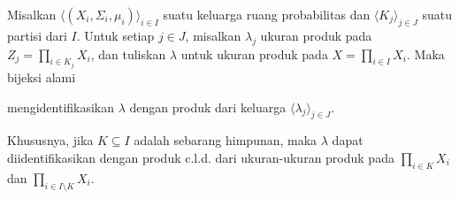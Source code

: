  Misalkan
$\langle(X_i,\Sigma_i,\mu_i)\rangle_{i\in I}$ suatu
keluarga ruang probabilitas dan $\langle K_j\rangle_{j\in J}$ suatu
partisi dari $I$.   Untuk setiap $j\in J$, misalkan $\lambda_j$ ukuran produk
pada $Z_j=\prod_{i\in K_j}X_i$, dan tuliskan $\lambda$ untuk
ukuran produk pada $X=\prod_{i\in I}X_i$.   Maka bijeksi alami


\noindent mengidentifikasikan $\lambda$ dengan produk dari keluarga
$\langle\lambda_j\rangle_{j\in J}$.

Khususnya, jika $K\subseteq I$ adalah sebarang himpunan, maka $\lambda$ dapat
diidentifikasikan dengan produk c.l.d. dari ukuran-ukuran produk pada
$\prod_{i\in K}X_i$ dan $\prod_{i\in I\setminus K}X_i$.

